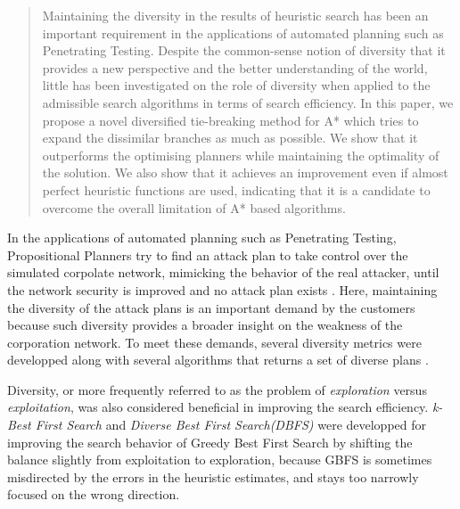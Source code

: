 
\begin{abstract}
Maintaining the diversity in the results of heuristic search has been an
important requirement in the applications of automated planning such as
Penetrating Testing.
Despite the common-sense notion of diversity that it provides a new
perspective and the better understanding of the world, little has been investigated on the
role of diversity when applied to the admissible search algorithms in terms of search efficiency.
In this paper, we propose a novel 
diversified tie-breaking method for A* 
which tries to expand the dissimilar branches as much as possible.
We show that it outperforms the \sota optimising planners while maintaining the optimality of the solution.
We also show that it achieves an improvement even if almost perfect heuristic functions are used, indicating that it is a candidate to overcome the overall limitation of A* based algorithms.
\end{abstract}


In the applications of automated planning such as Penetrating Testing, Propositional Planners try to find an attack plan to take control over the simulated corpolate network, mimicking the behavior of the real attacker, until the network security is improved and no attack plan exists \cite{boddy2005course}.  Here, maintaining the diversity of the attack plans is an important demand by the customers because such diversity provides a broader insight on the weakness of the corporation network. To meet these demands, several diversity metrics were developped \cite{roberts2014evaluating,goldman2015measuring} along with several algorithms that returns a set of diverse plans \cite{srivastava2007domain,coman2011generating,nguyen2012generating}.

Diversity, or more frequently referred to as the problem of \emph{exploration} versus
\emph{exploitation}, was also considered beneficial in improving the search efficiency.
\emph{k-Best First Search} \cite{felner2003kbfs} and \emph{Diverse Best First Search(DBFS)}
\cite{imai2011novel} were developped for
improving the search behavior of Greedy Best First Search by shifting the
balance slightly from exploitation to exploration, because GBFS
is sometimes misdirected by the errors in the heuristic estimates,
and stays too narrowly focused on the wrong direction.

